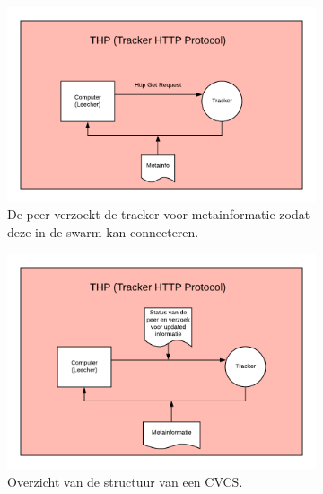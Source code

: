 \begin{figure}[h!]
	\centering
	\begin{subfigure}[b]{.5\textwidth}
	\centering
		\includegraphics[scale=.3]{THP-1.png}
		\caption[THP Peer verzoekt informatie]{De peer verzoekt de tracker voor metainformatie zodat deze in de swarm kan connecteren.}
	\end{subfigure}%
	\begin{subfigure}[b]{.5\textwidth}
	\centering
		\includegraphics[scale=.3]{THP-2.png}
			\caption[Overzicht structuur CVCS]{Overzicht van de structuur van een CVCS.}
	\end{subfigure}%
	\hfill
	\begin{subfigure}{.5\textwidth}
		\centering

\end{subfigure}
\end{figure}

